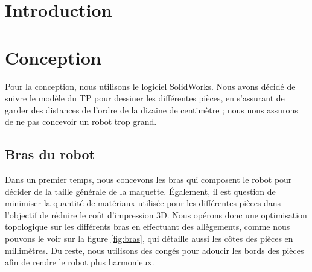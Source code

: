 \documentclass[a4paper, 11pt]{report}
\begin{document}

\clearpage\setcounter{page}{2}

\tableofcontents

\section*{Introduction}

\section{Conception}

Pour la conception, nous utilisons le logiciel SolidWorks. Nous avons décidé de suivre le modèle du TP pour dessiner les différentes pièces, 
en s'assurant de garder des distances de l'ordre de la dizaine de centimètre ; nous nous assurons de ne pas concevoir un robot trop grand.

\subsection{Bras du robot}

Dans un premier temps, nous concevons les bras qui composent le robot pour décider de la taille générale de la maquette.
Également, il est question de minimiser la quantité de matériaux utilisée pour les différentes pièces dans l'objectif de réduire le coût d'impression 3D.
Nous opérons donc une optimisation topologique sur les différents bras en effectuant des allègements, comme nous pouvons le voir sur la figure \ref{fig:bras}, 
qui détaille aussi les côtes des pièces en millimètres. Du reste, nous utilisons des congés pour adoucir les bords des pièces afin de rendre le robot plus harmonieux.
\end{document}
